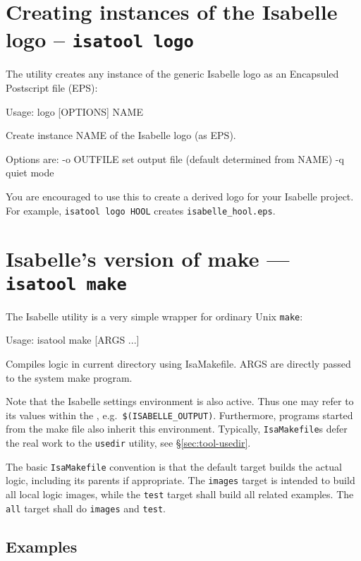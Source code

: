 \section{Creating instances of the Isabelle logo -- \texttt{isatool
    logo}}

The  utility creates any instance of the generic Isabelle logo as
an Encapsuled Postscript file (EPS):
\begin{ttbox}
Usage: logo [OPTIONS] NAME

  Create instance NAME of the Isabelle logo (as EPS).

  Options are:
    -o OUTFILE   set output file (default determined from NAME)
    -q           quiet mode
\end{ttbox}
You are encouraged to use this to create a derived logo for your Isabelle
project.  For example, \texttt{isatool logo HOOL} creates
\texttt{isabelle_hool.eps}.


\section{Isabelle's version of make --- \texttt{isatool make}}

The Isabelle  utility is a very simple wrapper for
ordinary Unix \texttt{make}:
\begin{ttbox}
Usage: isatool make [ARGS ...]

  Compiles logic in current directory using IsaMakefile.
  ARGS are directly passed to the system make program.
\end{ttbox}
Note that the Isabelle settings environment is also active. Thus one
may refer to its values within the , e.g.\ 
\texttt{\$(ISABELLE_OUTPUT)}. Furthermore, programs started from the
make file also inherit this environment.  Typically,
\texttt{IsaMakefile}s defer the real work to the \texttt{usedir}
utility, see \S\ref{sec:tool-usedir}.

\medskip The basic \texttt{IsaMakefile} convention is that the default
target builds the actual logic, including its parents if appropriate.
The \texttt{images} target is intended to build all local logic
images, while the \texttt{test} target shall build all related
examples.  The \texttt{all} target shall do \texttt{images} and
\texttt{test}.


\subsection*{Examples}

